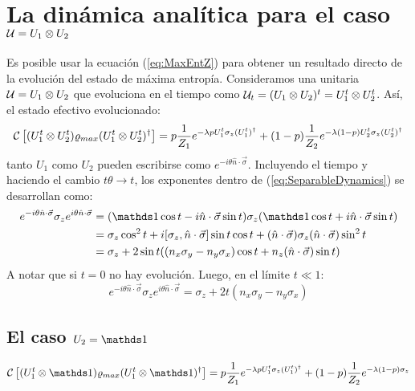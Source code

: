 \section{La dinámica analítica para el caso $\mathcal{U}=U_{1}\otimes U_{2}$}
Es posible usar la ecuación (\ref{eq:MaxEntZ}) para obtener un resultado directo de la evolución del estado de máxima entropía. Consideramos una unitaria $\mathcal{U}=U_{1}\otimes U_{2}$ que evoluciona en el tiempo como $\mathcal{U}_{t}=(U_{1}\otimes U_{2})^{t}=U_{1}^{t}\otimes U_{2}^{t}$. Así, el estado efectivo evolucionado:
\begin{equation}\label{eq:SeparableDynamics}
\mathcal{C}\left[(U_{1}^{t}\otimes U_{2}^{t})\varrho_{max}(U_{1}^{t}\otimes U_{2}^{t})^{\dag}\right]=p\frac{1}{Z_{1}}e^{-\lambda p U_{1}^{t}\sigma_{z}(U_{1}^t)^{\dag}}+(1-p)\frac{1}{Z_{2}}e^{-\lambda (1-p)U_{2}^{t}\sigma_{z}(U_{2}^t)^{\dag}}
\end{equation}
tanto $U_{1}$ como $U_{2}$ pueden escribirse como $e^{-i\theta \hat{n}\cdot\vec{\sigma}}$. Incluyendo el tiempo y haciendo el cambio $t\theta\rightarrow t$, los exponentes dentro de (\ref{eq:SeparableDynamics}) se desarrollan como:
\begin{align*}
    e^{-i\theta \hat{n}\cdot\vec{\sigma}}\sigma_{z}e^{i\theta \hat{n}\cdot\vec{\sigma}}&=(\Id\cos{t}-i\hat{n}\cdot\vec{\sigma}\sin{t})\sigma_{z}(\Id\cos{t}+i\hat{n}\cdot\vec{\sigma}\sin{t})\\
    &=\sigma_{z}\cos^{2}{t}+i[\sigma_{z},\hat{n}\cdot\vec{\sigma}]\sin{t}\cos{t}+(\hat{n}\cdot\vec{\sigma})\sigma_{z}(\hat{n}\cdot\vec{\sigma})\sin^{2}{t}\\
    &=\sigma_{z}+2\sin{t}\qty((n_{x}\sigma_{y}-n_{y}\sigma_{x})\cos{t}+n_{z}(\hat{n}\cdot\vec{\sigma})\sin{t})
\end{align*}
A notar que si $t=0$ no hay evolución. Luego, en el límite $t\ll 1$:
\begin{equation*}
    e^{-i\theta \hat{n}\cdot\vec{\sigma}}\sigma_{z}e^{i\theta \hat{n}\cdot\vec{\sigma}}=\sigma_{z}+2t(n_{x}\sigma_{y}-n_{y}\sigma_{x})
\end{equation*}
\subsection{El caso $U_{2}=\Id$}
\begin{equation}\label{eq:SeparableDynamicsUxI}
\CG{(U_{1}^{t}\otimes \Id)\varrho_{max}(U_{1}^{t}\otimes \Id)^{\dag}}=p\frac{1}{Z_{1}}e^{-\lambda p U_{1}^{t}\sigma_{z}(U_{1}^t)^{\dag}}+(1-p)\frac{1}{Z_{2}}e^{-\lambda (1-p)\sigma_{z}}
\end{equation}
